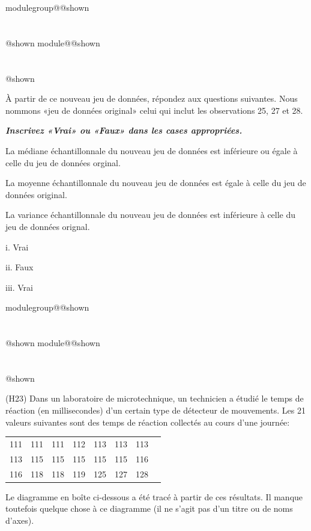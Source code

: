 \documentclass{Evaluation}
\makeatletter
\newcommand{\vfrep}[1]{}
\newcommand{\currentmodulekey}{}
\newcommand{\currentmoduletitle}{}
\newcommand{\currentgroupkey}{}
\newcommand{\currentgrouptitle}{}
\newcommand{\showmoduleifneeded}{%
  \ifx\currentgroupkey\empty\else
    \expandafter\ifx\csname modulegroup@\currentgroupkey @shown\endcsname\relax
      \section*{\currentgrouptitle}%
      \expandafter\gdef\csname modulegroup@\currentgroupkey @shown\endcsname{1}%
    \fi
  \fi
  \expandafter\ifx\csname module@\currentmodulekey @shown\endcsname\relax
    \section*{\currentmoduletitle}%
    \expandafter\gdef\csname module@\currentmodulekey @shown\endcsname{1}%
  \fi
}
\newenvironment{A22}{\showmoduleifneeded}{}
\newenvironment{H23}{\showmoduleifneeded}{}
\makeatother
\begin{document}
\begin{questions}
\begin{A22}
\begin{parts}
À partir de ce nouveau jeu de données, répondez aux questions suivantes. Nous nommons «jeu de données original» celui qui inclut les observations 25, 27 et 28.

\textbf{\textit{Inscrivez «Vrai» ou «Faux» dans les cases appropriées.}}

\begin{subparts}
\subpart[1]La médiane échantillonnale du nouveau jeu de données est inférieure ou égale à celle du jeu de données orginal.

\vfrep{}

\subpart[1] La moyenne échantillonnale du nouveau jeu de données est égale à celle du jeu de données original.

\vfrep{}

\subpart[1] La variance échantillonnale du nouveau jeu de données est inférieure à celle du jeu de données orignal.

\vfrep{}

\begin{solution}
    
    i. Vrai

    ii. Faux

    iii. Vrai
\end{solution}
   

\end{subparts}
\end{parts}

\end{A22}

\begin{H23}
\question
(H23)
Dans un laboratoire de microtechnique, un technicien a étudié le temps de réaction (en millisecondes) d'un certain type de détecteur de mouvements. Les 21 valeurs suivantes sont des temps de réaction collectés au cours d'une journée:

\begin{center}
\begin{tabular}{  c c c c c c c c }
111  &111  &111  &112  &113  &113  &113 \\
113 &115  &115  &115  &115 &115 & 116 \\
116 & 118 & 118 & 119 & 125 &127 & 128\\
\end{tabular}
\end{center}

Le diagramme en boîte ci-dessous a été tracé à partir de ces résultats. Il manque toutefois quelque chose à ce diagramme (il ne s'agit pas d'un titre ou de noms d'axes).


\end{H23}
\end{questions}
\end{document}
